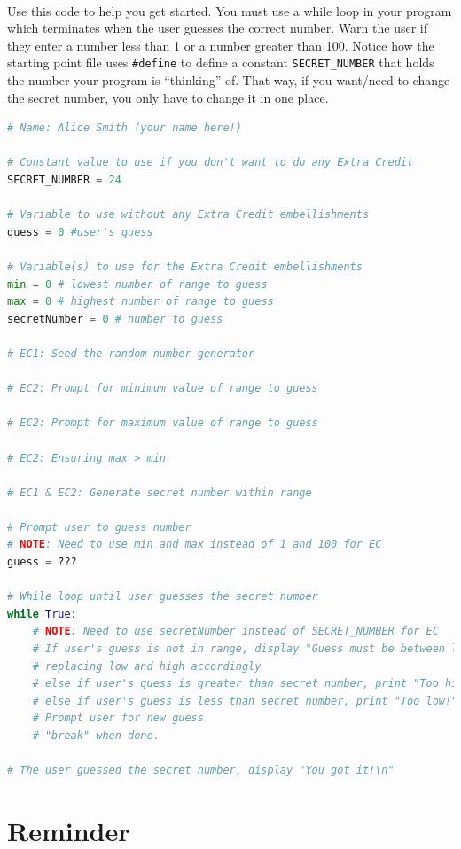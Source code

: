 \documentclass[letter,10pt]{article}
\begin{document}
    \paragraph{}Use this code to help you get started. You must use a while loop in your program which terminates when the user guesses the correct number. Warn the user if they enter a number less than 1 or a number greater than 100. Notice how the starting point file uses \texttt{\#define} to define a constant \texttt{SECRET\_NUMBER} that holds the number your program is ``thinking'' of. That way, if you want/need to change the secret number, you only have to change it in one place.
    \begin{lstlisting}[language=python]
# Name: Alice Smith (your name here!)

# Constant value to use if you don't want to do any Extra Credit
SECRET_NUMBER = 24

# Variable to use without any Extra Credit embellishments
guess = 0 #user's guess

# Variable(s) to use for the Extra Credit embellishments
min = 0 # lowest number of range to guess
max = 0 # highest number of range to guess
secretNumber = 0 # number to guess

# EC1: Seed the random number generator

# EC2: Prompt for minimum value of range to guess

# EC2: Prompt for maximum value of range to guess

# EC2: Ensuring max > min

# EC1 & EC2: Generate secret number within range

# Prompt user to guess number
# NOTE: Need to use min and max instead of 1 and 100 for EC
guess = ???

# While loop until user guesses the secret number
while True:
    # NOTE: Need to use secretNumber instead of SECRET_NUMBER for EC
    # If user's guess is not in range, display "Guess must be between low and high!",
    # replacing low and high accordingly
    # else if user's guess is greater than secret number, print "Too high!"
    # else if user's guess is less than secret number, print "Too low!"
    # Prompt user for new guess
    # "break" when done.

# The user guessed the secret number, display "You got it!\n"
    \end{lstlisting}

    \section*{Reminder}
\end{document}
